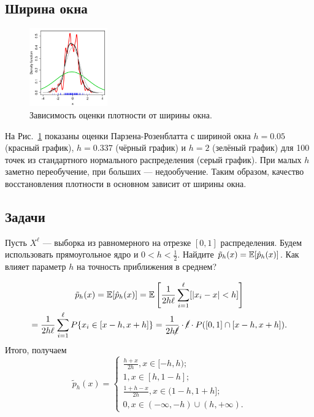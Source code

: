 {\subsection*{Ширина окна}
\begin{figure}
\includegraphics[width=0.3\textwidth]{chapters/bayesian/kde_bandwidth.png}
\caption{Зависимость оценки плотности от ширины окна.}\label{kde:bandwidth}
\end{figure}

На Рис.~\ref{kde:bandwidth} показаны оценки Парзена-Розенблатта с шириной окна
$h=0.05$ (красный график), $h=0.337$ (чёрный график) и $h=2$ (зелёный график)
для 100 точек из стандартного нормального распределения (серый график). При
малых $h$ заметно переобучение, при больших --- недообучение. Таким образом,
качество восстановления плотности в основном зависит от ширины окна.

\newpage
\subsection*{Задачи}

\begin{problem}
Пусть $X^\ell$ --- выборка из равномерного на отрезке $[0,1]$ распределения.
Будем использовать прямоугольное ядро и $0 < h < \frac{1}{2}$. Найдите
$\tilde{p}_h(x) = \mathbb{E}[\hat{p}_h(x)]$. Как влияет параметр $h$ на точность
приближения в среднем?
\end{problem}

\begin{solution}
\begin{multline*}
\tilde{p}_h(x) = \mathbb{E}[\hat{p}_h(x)]
  = \mathbb{E}\left[\frac{1}{2h\ell}\sum_{i = 1}^\ell [|x_i - x| < h]\right]\\
  = \frac{1}{2h\ell}\sum_{i = 1}^\ell P\{x_i \in [x - h, x + h]\}
  = \frac{1}{2h \cancel{\ell}} \cdot \cancel{\ell} \cdot P([0, 1] \cap [x - h, x + h]).
\end{multline*}
Итого, получаем
\begin{equation*}
\tilde{p}_h(x) =
\begin{cases}
\frac{h + x}{2h}, x \in [-h, h);\\
1, x \in [h, 1 - h];\\
\frac{1 + h - x}{2h}, x \in (1 - h, 1 + h];\\
0, x \in (-\infty, -h) \cup (h, +\infty).
\end{cases}
\end{equation*}


\end{solution}}
